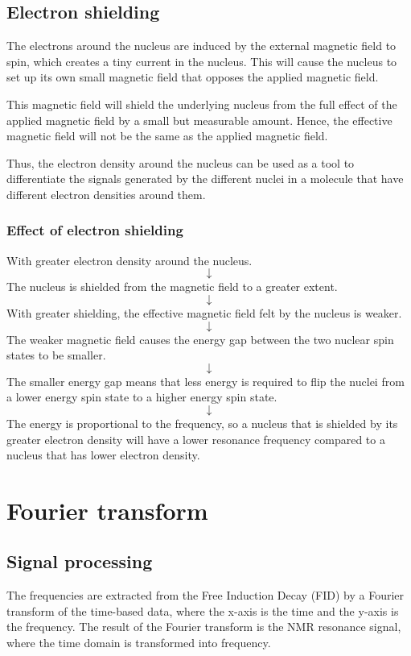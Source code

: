 \documentclass[11pt]{article}
\begin{document}
\newpage
\subsection{Electron shielding}
\label{sec:orge83e599}

The electrons around the nucleus are induced by the external magnetic field to spin, which creates a tiny current in the nucleus. This will cause the nucleus to set up its own small magnetic field that opposes the applied magnetic field.

This magnetic field will shield the underlying nucleus from the full effect of the applied magnetic field by a small but measurable amount. Hence, the effective magnetic field will not be the same as the applied magnetic field.

Thus, the electron density around the nucleus can be used as a tool to differentiate the signals generated by the different nuclei in a molecule that have different electron densities around them.
\subsubsection{Effect of electron shielding}
\label{sec:orgbbd3876}
With greater electron density around the nucleus.
\[\downarrow\]
The nucleus is shielded from the magnetic field to a greater extent.
\[\downarrow\]
With greater shielding, the effective magnetic field felt by the nucleus is weaker.
\[\downarrow\]
The weaker magnetic field causes the energy gap between the two nuclear spin states to be smaller.
\[\downarrow\]
The smaller energy gap means that less energy is required to flip the nuclei from a lower energy spin state to a higher energy spin state.
\[\downarrow\]
The energy is proportional to the frequency, so a nucleus that is shielded by its greater electron density will have a lower resonance frequency compared to a nucleus that has lower electron density.

\newpage
\section{Fourier transform}
\label{sec:org3cd0da2}

\subsection{Signal processing}
\label{sec:orgdfaca60}
The frequencies are extracted from the Free Induction Decay (FID) by a Fourier transform of the time-based data, where the x-axis is the time and the y-axis is the frequency. The result of the Fourier transform is the NMR resonance signal, where the time domain is transformed into frequency.
\end{document}
